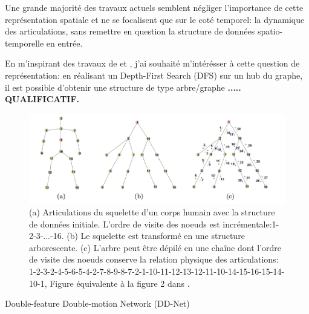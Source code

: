 Une grande majorité des travaux actuels semblent négliger l'importance de cette représentation spatiale et ne se focalisent que sur le coté temporel: la dynamique des articulations, sans remettre en question la structure de données spatio-temporelle en entrée.

En m'inspirant des travaux de \cite{liu2016spatio} et \cite{2018arXiv180110304Y}, j'ai souhaité m'intérésser à cette question de représentation: en réalisant un Depth-First Search (DFS) sur un hub du graphe, il est possible d'obtenir une structure de type arbre/graphe\textbf{ ..... QUALIFICATIF.}

\begin{figure}[H]
    \centering
    \includegraphics[width=1\linewidth]{Images/DFS.png}
    \caption{(a) Articulations du squelette d'un corps humain avec la structure de données initiale. L'ordre de visite des noeuds est incrémentale:1-2-3-...-16. (b) Le squelette est transformé en une structure arborescente. (c)  L'arbre peut être dépilé en une chaîne dont l'ordre de visite des noeuds conserve la relation physique des articulations: 1-2-3-2-4-5-6-5-4-2-7-8-9-8-7-2-1-10-11-12-13-12-11-10-14-15-16-15-14-10-1, Figure équivalente à la figure 2 dans  \cite{liu2016spatio}.}
    \label{fig:DFS}
\end{figure}

 Double-feature Double-motion Network (DD-Net) \cite{2019arXiv190709658Y}

